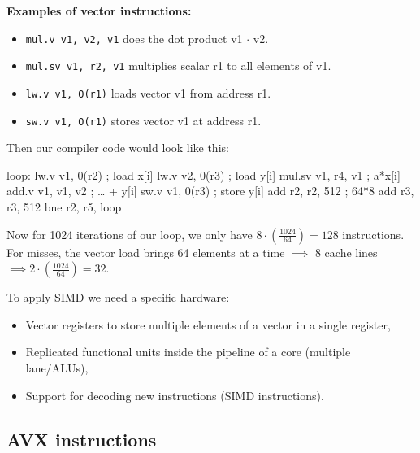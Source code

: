     \begin{tcolorbox}[gris]
        \textbf{Examples of vector instructions:}
        \begin{itemize}[left=10pt, label=\textbullet]
            \item \lstinline!mul.v v1, v2, v1! does the dot product v1 $\cdot$ v2.
            \item  \lstinline!mul.sv v1, r2, v1! multiplies scalar r1 to all elements of v1. 
            \item \lstinline!lw.v v1, O(r1)! loads vector v1 from address r1. 
            \item \lstinline!sw.v v1, O(r1)! stores vector v1 at address r1.
        \end{itemize}
    \end{tcolorbox}
    Then our compiler code would look like this:
    \begin{codeCenter}
    \begin{Ccode}
loop:
    lw.v v1, 0(r2) ; load x[i]
    lw.v v2, 0(r3) ; load y[i]
    mul.sv v1, r4, v1 ; a*x[i]
    add.v v1, v1, v2 ; … + y[i]
    sw.v v1, 0(r3) ; store y[i]
    add r2, r2, 512 ; 64*8
    add r3, r3, 512
    bne r2, r5, loop
    \end{Ccode}
    \end{codeCenter}
    \begin{tcolorbox}[gris]
        Now for 1024 iterations of our loop, we only have $8\cdot \left(\frac{1024}{64}\right)=128$ instructions. For misses, the vector load brings 64 elements at a time $\implies$ 8 cache lines $\implies 2\cdot \left(\frac{1024}{64}\right)=32$.
    \end{tcolorbox}
    To apply SIMD we need a specific hardware: 
    \begin{itemize}[left=10pt, label=\textbullet]
        \item Vector registers to store multiple elements of a vector in a single register, 
        \item Replicated functional units inside the pipeline of a core (multiple lane/ALUs), 
        \item Support for decoding new instructions (SIMD instructions).
    \end{itemize}
    \subsection{AVX instructions}
        
